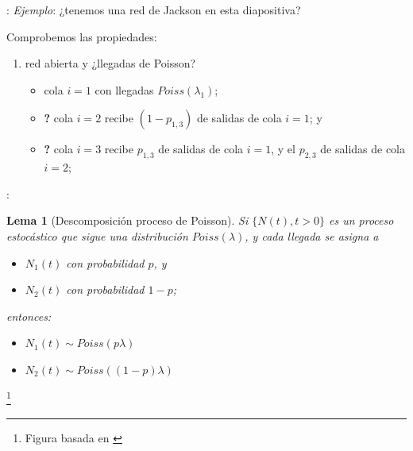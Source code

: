 \documentclass[xcolor={x11names}]{beamer}
\newcommand{\cmark}{\ding{51}}%
\newtheorem{lema}{Lema}[section]
\begin{document}
\begin{frame}{\secname: \subsecname}
    \textit{Ejemplo}: ¿tenemos una red
    de Jackson en esta diapositiva?

    \begin{figure}
        \resizebox{.7\textwidth}{!}{%
            
        }
    \end{figure}

    Comprobemos las propiedades:
    \begin{enumerate}
        \item red abierta y
            ¿llegadas de Poisson?

            \begin{itemize}
                \item \cmark
                    cola $i=1$ con llegadas
                    $Poiss(\lambda_1)$;
                \item \textbf{?}
                    cola $i=2$ recibe
                    $(1-p_{1,3})$ de salidas
                    de cola $i=1$; y
                \item \textbf{?}
                    cola $i=3$ recibe
                    $p_{1,3}$ de salidas
                    de cola $i=1$, y el
                    $p_{2,3}$ de salidas de
                    cola $i=2$;
            \end{itemize}
    \end{enumerate}
\end{frame}




\begin{frame}{\secname: \subsecname}
    \begin{lema}[Descomposición proceso
        de Poisson]
        Si $\{N(t), t>0\}$ es un proceso
        estocástico que sigue una distribución
        $Poiss(\lambda)$,
        y cada llegada se asigna a
        \begin{itemize}
            \item $N_1(t)$ con probabilidad $p$,
                y
            \item $N_2(t)$ con probabilidad
                $1-p$;
        \end{itemize}
        entonces:
        \begin{itemize}
            \item $N_1(t)\sim Poiss(p\lambda)$
            \item $N_2(t)\sim Poiss\left((1-p)\lambda\right)$
        \end{itemize}
    \end{lema}

    \footnote{
        Figura basada en
        \cite[Figura 3.7]{amable}} 
    \begin{figure}    
        
    \end{figure}
\end{frame}
\end{document}
